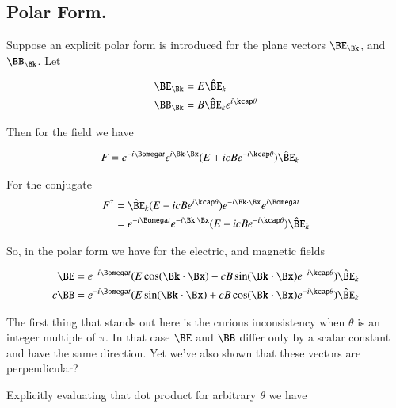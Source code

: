 \subsection{Polar Form.}

Suppose an explicit polar form is introduced for the plane vectors $\BE_\Bk$, and $\BB_\Bk$.  Let

\begin{align*}
\BE_\Bk &= E {\hat{\BE}_k} \\
\BB_\Bk &= B {\hat{\BE}_k} e^{i\kcap \theta} 
\end{align*}

Then for the field we have

\begin{align}\label{eqn:phasorPolar}
F &= e^{-i\Bomega t} e^{i \Bk \cdot \Bx} (E + i c B e^{-i\kcap \theta}) \hat{\BE}_k 
\end{align}

For the conjugate 
\begin{align*}
F^\dagger 
&= 
\hat{\BE}_k
(E - i c B e^{i\kcap \theta})
e^{-i \Bk \cdot \Bx}
e^{i\Bomega t} \\
&=
e^{-i\Bomega t} e^{-i \Bk \cdot \Bx} (E - i c B e^{-i\kcap \theta}) \hat{\BE}_k
\end{align*}

So, in the polar form we have for the electric, and magnetic fields

\begin{align}
\BE &= e^{-i\Bomega t} (E \cos(\Bk \cdot \Bx) - c B \sin(\Bk \cdot \Bx) e^{-i \kcap\theta}) \hat{\BE}_k \\
c \BB &= e^{-i\Bomega t} (E \sin(\Bk \cdot \Bx) + c B \cos(\Bk \cdot \Bx) e^{-i \kcap\theta}) \hat{\BE}_k
\end{align}

The first thing that stands out here is the curious inconsistency when $\theta$ is an integer multiple of $\pi$.  In that case $\BE$ and $\BB$ differ only by a scalar constant and have the same direction.  Yet we've also shown that these vectors are perpendicular?

Explicitly evaluating that dot product for arbitrary $\theta$ we have

